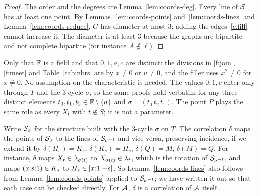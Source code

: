 \begin{proof}
The order and the degrees are Lemma~\ref{lem:coords-deg}. Every line of $\mathcal{S}$ has at least one point. By Lemmas~\ref{lem:coords-points} and~\ref{lem:coords-lines} and Lemma~\ref{lem:coords-reduce}, $G$ has diameter at most $3$; adding the edges~\ref{c:fill} cannot increase it. The diameter is at least $3$ because the graphs are bipartite and not complete bipartite (for instance $A \notin \ell$).
\end{proof}

\begin{remark}
Only that $\mathbb{F}$ is a field and that $0, 1, a, c$ are distinct: the divisions in \ref{f:join}, \ref{f:meet} and Table~\ref{tab:nbrs} are by $x \ne 0$ or $u \ne 0$, and the filler uses $x^2 \neq 0$ for $x \neq 0$. No assumption on the characteristic is needed. The values $0, 1, c$ enter only through $T$ and the $3$-cycle $\sigma$, so the same proofs hold verbatim for any three distinct elements $t_0, t_1, t_2 \in \mathbb{F} \setminus \{a\}$ and $\sigma = (t_0\,t_2\,t_1)$. The point $P$ plays the same role as every $X_t$ with $t \notin S$; it is not a parameter.
\end{remark}

\begin{remark}[Duality]\label{rem:duality}
Write $\mathcal{S}_\sigma$ for the structure built with the $3$-cycle $\sigma$ on $T$. The correlation $\delta$ maps the points of $\mathcal{S}_\sigma$ to the lines of $\mathcal{S}_{\sigma^{-1}}$ and vice versa, preserving incidence, if we extend it by $\delta(H_s) = K_s$, $\delta(K_s) = H_s$, $\delta(Q) = M$, $\delta(M) = Q$. For instance, $\delta$ maps $X_t \in \lambda_{\sigma(t)}$ to $X_{\sigma(t)} \in \lambda_t$, which is the rotation of $\mathcal{S}_{\sigma^{-1}}$, and maps $({x}{:}{s}{:}{1}) \in K_s$ to $H_s \in [{x}{:}{1}{:}{-s}]$. So Lemma~\ref{lem:coords-lines} also follows from Lemma~\ref{lem:coords-points} applied to $\mathcal{S}_{\sigma^{-1}}$; we have written it out so that each case can be checked directly. For $\mathcal{A}$, $\delta$ is a correlation of $\mathcal{A}$ itself.
\end{remark}

